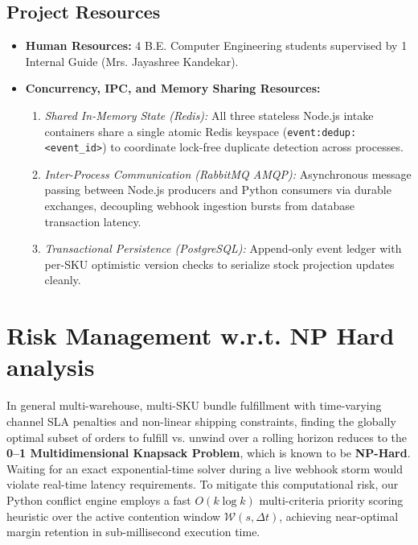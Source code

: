 \documentclass[oneside,a4paper,12pt]{report}
\newcommand{\GuideName}{Mrs. Jayashree Kandekar}
\begin{document}
\subsection{Project Resources}
\begin{itemize}
  \item \textbf{Human Resources:} 4 B.E. Computer Engineering students supervised by 1 Internal Guide (\GuideName).
  \item \textbf{Concurrency, IPC, and Memory Sharing Resources:}
  \begin{enumerate}
    \item \textit{Shared In-Memory State (Redis):} All three stateless Node.js intake containers share a single atomic Redis keyspace (\texttt{event:dedup:<event\_id>}) to coordinate lock-free duplicate detection across processes.
    \item \textit{Inter-Process Communication (RabbitMQ AMQP):} Asynchronous message passing between Node.js producers and Python consumers via durable exchanges, decoupling webhook ingestion bursts from database transaction latency.
    \item \textit{Transactional Persistence (PostgreSQL):} Append-only event ledger with per-SKU optimistic version checks to serialize stock projection updates cleanly.
  \end{enumerate}
\end{itemize}

\section{Risk Management w.r.t. NP Hard analysis}
In general multi-warehouse, multi-SKU bundle fulfillment with time-varying channel SLA penalties and non-linear shipping constraints, finding the globally optimal subset of orders to fulfill vs. unwind over a rolling horizon reduces to the \textbf{0--1 Multidimensional Knapsack Problem}, which is known to be \textbf{NP-Hard}. Waiting for an exact exponential-time solver during a live webhook storm would violate real-time latency requirements. To mitigate this computational risk, our Python conflict engine employs a fast $O(k \log k)$ multi-criteria priority scoring heuristic over the active contention window $\mathcal{W}(s, \Delta t)$, achieving near-optimal margin retention in sub-millisecond execution time.
\end{document}
